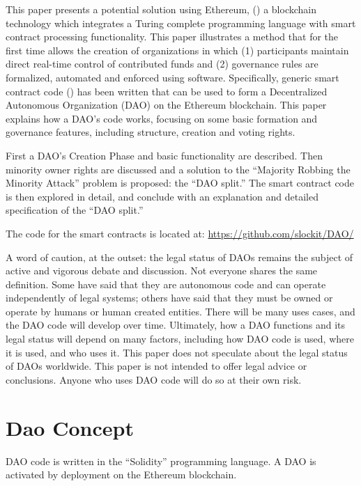 \documentclass[9pt,oneside]{amsart}
\begin{document}
\begin{multicols}{2}
This paper presents a potential solution using Ethereum, (\cite{buterin2013ethereum,Wood2014ethereum}) a blockchain technology which integrates a Turing complete programming language with smart contract processing functionality. This paper illustrates a method that for the first time allows the creation of organizations in which (1) participants maintain direct real-time control of contributed funds and (2)  governance rules are formalized, automated and enforced using software. Specifically, generic smart contract code (\cite{szabo1997formalizing, miller1997future}) has been written that can be used to form a Decentralized Autonomous Organization (DAO) on the Ethereum blockchain. This paper explains how a DAO's code works, focusing on some basic formation and governance features, including structure, creation and voting rights.

First a DAO's Creation Phase and basic functionality are described. Then minority owner rights are discussed and a solution to the ``Majority Robbing the Minority Attack'' problem is proposed: the ``DAO split.'' The smart contract code is then explored in detail, and conclude with an explanation and detailed specification of the ``DAO split.''

The code for the smart contracts is located at: \url{https://github.com/slockit/DAO/}

A word of caution, at the outset:  the legal status of DAOs remains the subject of active and vigorous debate and discussion. Not everyone shares the same definition. Some have said that they are autonomous code and can operate independently of legal systems; others have said that they must be owned or operate by humans or human created entities. There will be many uses cases, and the DAO code will develop over time. Ultimately, how a DAO functions and its legal status will depend on many factors, including how DAO code is used, where it is used, and who uses it. This paper does not speculate about the legal status of DAOs worldwide. This paper is not intended to offer legal advice or conclusions. Anyone who uses DAO code will do so at their own risk.



\section{Dao Concept}

DAO code is written in the ``Solidity'' programming language. A DAO is activated by deployment on the Ethereum blockchain. 


\end{multicols}
\end{document}
